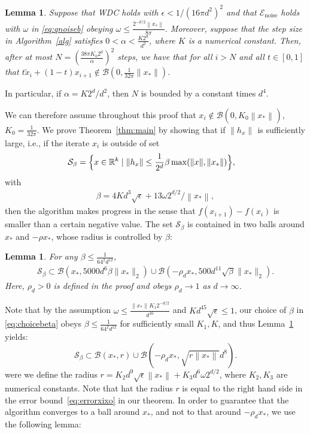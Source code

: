 \documentclass[11pt]{article}
\newtheorem{lemma}[theorem]{Lemma}
\newcommand{\R}{\mathbb{R}}
\newcommand{\eps}{\epsilon}
\newcommand{\zetacheck}{\rho}
\newcommand{\xo}{x_\ast}
\newcommand{\Tnorm}{}
\newcommand\norm[2][\Tnorm]{\ensuremath{{\left\|#2\right\|}_{#1}}}
\newcommand\setS{\mathcal S}
\newcommand\eventnoisesmall{\mathcal E_{\text{noise}}}
\newcommand{\whcomm}[2]{{\color{black} #1}{\color{black} #2}} %
\begin{document}
\begin{lemma}
\label{lem:notinzeroball}
Suppose that WDC holds with $\epsilon < 1/ (16 \pi d^2)^2$ and that $\eventnoisesmall$ holds with $\omega$ in \eqref{eq:qnoiseb} obeying $\omega \leq \frac{2^{-d/2} \norm{\xo}}{8\pi}$.
Moreover, suppose that the step size in Algorithm~\ref{alg} satisfies $0<\alpha < \frac{K 2^d}{d^2}$, where $K$ is a numerical constant.
Then, after at most $N= (\frac{38 \pi K_0 2^d}{\alpha})^2$ steps, we have that for all $i>N$ 
\whcomm{}{ and all $t \in [0, 1]$ that $t \tilde{x}_i + (1 - t) x_{i + 1} \notin \mathcal{B}(0, \frac{1}{32\pi} \|x_*\|)$.}
\end{lemma}

In particular, if  $\alpha = K2^d/d^ 2$, then $N$ is bounded by a constant times $d^4$.

We can therefore assume throughout this proof that $x_i \notin \mathcal B(0, K_0 \norm{\xo})$, $K_0=\frac{1}{32\pi}$.
We prove Theorem~\ref{thm:main} by showing that if $\norm{h_x}$ is sufficiently large, i.e., if the iterate $x_i$ is outside of set
\begin{align*}
\setS_{\beta} &= \Bigl \{ x \in \R^k \mid \| h_x \| \leq \frac{1}{2^d} \beta \max(\|x\|, \|\xo\| ) \Bigr \},
\end{align*}
with
\begin{align}
\label{eq:choicebeta}
\beta = 4 K d^3 \sqrt{\epsilon}
+
13 \omega 2^{d/2}/\norm{\xo},
\end{align}
then the algorithm makes progress in the sense that
$f(x_{i+1}) - f(x_i)$ is smaller than a certain negative value.
The set $\setS_\beta$ is contained in two balls around
$\xo$ and $-\rho \xo$, whose radius is controlled by $\beta$:

\begin{lemma} \label{lemma:Sepsst}
For any $\beta \leq \frac{1}{64^2 d^{12}}$,
\begin{align}
\setS_\beta
\subset
\mathcal{B}(\xo, 5000 d^6 \beta \|\xo\|_2  ) \cup  \mathcal{B}( -\zetacheck_d \xo, 500 d^{11} \sqrt{\beta} \|\xo\|_2).
 \label{Seps-estimate-balls}
\end{align}
Here, $\rho_d>0$ is defined in the proof and obeys $\rho_d \to 1$ as $d \to \infty$.
\end{lemma}

Note that by the assumption $\omega \leq \frac{\norm{\xo} K_1 2^{-d/2} }{d^{16}}$ and $K d^{45} \sqrt{\eps} \leq 1$,
our choice of $\beta$ in \eqref{eq:choicebeta} obeys $\beta \leq \frac{1}{64^2 d^{12}}$ for sufficiently small $K_1, K$, and thus Lemma~\ref{lemma:Sepsst} yields:
\[
\setS_\beta
\subset
\mathcal{B}(\xo, r)
\cup
\mathcal{B}( -\zetacheck_d \xo, \sqrt{r \norm{\xo}} d^8).
\]
were we define the radius
$
r = K_2 d^9 \sqrt{\epsilon} \norm{\xo} + K_3 d^6 \omega 2^{d/2}
$, where $K_2,K_3$ are numerical constants.
Note that hat the radius $r$ is equal to the right hand side in the error bound~\eqref{eq:errorxixo} in our theorem.
In order to guarantee that the algorithm converges to a ball around $\xo$, and not to that around $-\rho_d \xo$, we use the following lemma:
\end{document}
